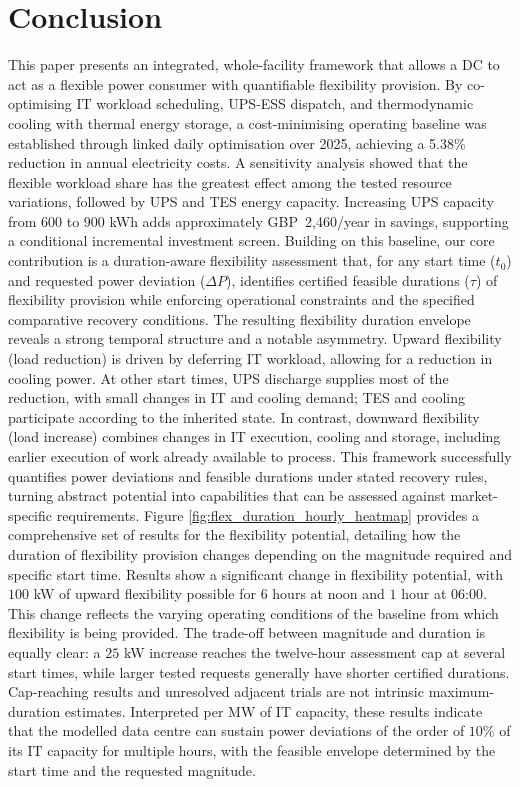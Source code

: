 \documentclass[lettersize,journal]{IEEEtran}
\newcommand{\rev}[1]{#1}
\begin{document}
\section{Conclusion}

This paper presents an integrated, whole-facility framework that allows a DC to act as a flexible power consumer with quantifiable flexibility provision. By co-optimising IT workload scheduling, UPS-ESS dispatch, and thermodynamic cooling with thermal energy storage, a cost-minimising operating baseline was established through linked daily optimisation over 2025, achieving a \rev{5.38\% reduction in annual electricity costs. A sensitivity analysis showed that the flexible workload share has the greatest effect among the tested resource variations, followed by UPS and TES energy capacity. Increasing UPS capacity from 600 to 900 kWh adds approximately GBP~2,460/year in savings, supporting a conditional incremental investment screen.} Building on this baseline, our core contribution is a duration-aware flexibility assessment that, for any start time ($t_0$) and requested power deviation ($\Delta P$), identifies certified feasible durations ($\tau$) of flexibility provision while enforcing operational constraints and the specified comparative recovery conditions. The resulting flexibility duration envelope reveals a strong temporal structure and a notable asymmetry. Upward flexibility (load reduction) is driven by deferring IT workload, allowing for a reduction in cooling power. At other start times, UPS discharge supplies most of the reduction, with small changes in IT and cooling demand; TES and cooling participate according to the inherited state. In contrast, downward flexibility (load increase) combines changes in IT execution, cooling and storage, including earlier execution of work already available to process. This framework successfully quantifies power deviations and feasible durations under stated recovery rules, turning abstract potential into capabilities that can be assessed against market-specific requirements. Figure \ref{fig:flex_duration_hourly_heatmap} provides a comprehensive set of results for the flexibility potential, detailing how the duration of flexibility provision changes depending on the magnitude required and specific start time. Results show a significant change in flexibility potential, with $100$ kW of upward flexibility possible for $6$ hours at noon and $1$ hour at $06$:$00$. This change reflects the varying operating conditions of the baseline from which flexibility is being provided. \rev{The trade-off between magnitude and duration is equally clear: a $25$ kW increase reaches the twelve-hour assessment cap at several start times, while larger tested requests generally have shorter certified durations. Cap-reaching results and unresolved adjacent trials are not intrinsic maximum-duration estimates. Interpreted per MW of IT capacity, these results indicate that the modelled data centre can sustain power deviations of the order of $10\%$ of its IT capacity for multiple hours, with the feasible envelope determined by the start time and the requested magnitude.}
\end{document}
